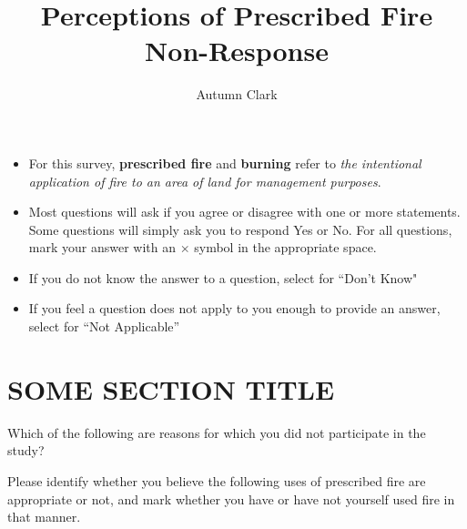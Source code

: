 \documentclass[
  english,
  checkmode = fill,
  ]{sdapsclassic}
\author{Autumn Clark}
\title{Perceptions of Prescribed Fire Non-Response}
\begin{document}
 
  \begin{questionnaire}

    \begin{info}
\begin{itemize}
     \item For this survey, \textbf{prescribed fire} and \textbf{burning} refer to \emph{the intentional application of fire to an area of land for management purposes}.
      \item Most questions will ask if you agree or disagree with one or more statements. 
	     Some questions will simply ask you to respond Yes or No. 
	    For all questions, mark your answer with an $\times$ symbol in the appropriate space. 
      \item If you do not know the answer to a question, select {} for ``Don't Know"
      \item If you feel a question does not apply to you enough to provide an answer, select  for ``Not Applicable''
\end{itemize}
    \end{info}
    
    \section{SOME SECTION TITLE}
    
        \begin{choicequestion}[cols=1]{Which of the following are reasons for which you did not participate in the study?}
    \end{choicequestion}
    
    
        \begin{choicegroup}[rowsep=0.25em]{Please identify whether you believe the following uses of prescribed fire are appropriate or not, and mark whether you have or have not yourself used fire in that manner.}
      

\end{choicegroup}
\end{questionnaire}
\end{document}
